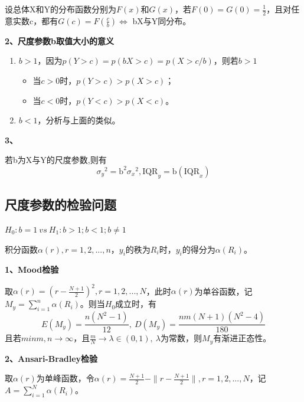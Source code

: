 \documentclass[lang=cn,10pt]{elegantbook}
\begin{document}
\begin{theorem}
    设总体X和Y的分布函数分别为$F(x)$和$G(x)$，若$F(0) = G(0) = \frac12$，且对任意实数c，都有$G(c) = F(\frac{c}b) \Longleftrightarrow $ bX与Y同分布。
\end{theorem}

\textbf{2、尺度参数b取值大小的意义}
\begin{enumerate}[(1)]
    \item $b > 1$，因为$p(Y>c)=p(bX>c)=p(X>c/b)$，则若$b>1$
          \begin{itemize}
              \item 当$c>0$时，$p(Y>c)>p(X>c)$；
              \item 当$c<0$时，$p(Y<c)>p(X<c)$。
          \end{itemize}
    \item $b<1$，分析与上面的类似。
\end{enumerate}

\textbf{3、}

若b为X与Y的尺度参数,则有
\begin{equation}
    {\sigma_y}^2={\mathrm{b}}^2{\sigma_x}^2,{\mathrm{IQR}}_y={\mathrm{b}}({\mathrm{IQR}}_x)
\end{equation}

\subsection{尺度参数的检验问题}
\begin{center}
    $H_0: b = 1 ~vs~ H_1: b > 1; b < 1; b \neq 1$
\end{center}
\begin{definition}
    积分函数$\alpha(r),r = 1,2,...,n$，$y_i$的秩为$R_i$时，$y_i$的得分为$\alpha(R_i)$。
\end{definition}

\textbf{1、Mood检验}

取$\alpha(r) = (r - \frac{N+1}2)^2,r = 1,2,...,N$，此时$\alpha(r)$为单谷函数，记$M_y = \sum_{i = 1}^n\alpha(R_i)$。则当$H_0$成立时，有
\begin{equation}
    E(M_y) = \frac{n(N^2-1)}{12}, ~ D(M_y) = \frac{nm(N+1)(N^2-4)}{180}
\end{equation}
且若$min{m,n} \rightarrow \infty$，且$\frac{m}N \rightarrow \lambda \in (0,1),~\lambda$为常数，则$M_y$有渐进正态性。

\textbf{2、Ansari-Bradley检验}

取$\alpha(r)$为单峰函数，令$\alpha(r) = \frac{N+1}2 - \|r - \frac{N+1}2\|,r = 1,2,...,N$，记$A = \sum_{i = 1}^N\alpha(R_i)$。
\end{document}
